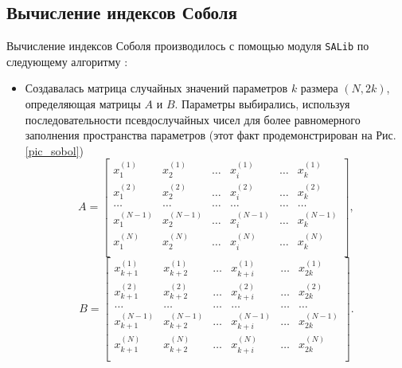 \documentclass[a4paper,12pt]{article} %
\begin{document}
\subsection{Вычисление индексов Соболя}
Вычисление индексов Соболя производилось с помощью модуля \texttt{SALib} \cite{Iwanaga2022, Herman2017} по следующему алгоритму \cite{saltelli2008global}:
\begin{itemize}
\item Создавалась матрица случайных значений параметров $k$ размера $(N,2k)$, определяющая матрицы $A$ и $B$. Параметры выбирались, используя последовательности псевдослучайных чисел для более равномерного заполнения пространства параметров \cite{sobol1967distribution, sobol1976uniformly} (этот факт продемонстрирован на Рис. \ref{pic_sobol})
\begin{displaymath}
A=\begin{bmatrix}
x_1^{(1)} & x_2^{(1)} & \ldots & x_i^{(1)} & \ldots & x_k^{(1)} \\
x_1^{(2)} & x_2^{(2)} & \ldots & x_i^{(2)} & \ldots & x_k^{(2)} \\
\ldots & \ldots & \ldots & \ldots & \ldots & \ldots \\
x_1^{(N-1)} & x_2^{(N-1)} & \ldots & x_i^{(N-1)} & \ldots & x_k^{(N-1)} \\
x_1^{(N)} & x_2^{(N)} & \ldots & x_i^{(N)} & \ldots & x_k^{(N)} \\
\end{bmatrix},
\end{displaymath}
\begin{displaymath}
B=\begin{bmatrix}
x_{k+1}^{(1)} & x_{k+2}^{(1)} & \ldots & x_{k+i}^{(1)} & \ldots & x_{2k}^{(1)} \\
x_{k+1}^{(2)} & x_{k+2}^{(2)} & \ldots & x_{k+i}^{(2)} & \ldots & x_{2k}^{(2)} \\
\ldots & \ldots & \ldots & \ldots & \ldots & \ldots \\
x_{k+1}^{(N-1)} & x_{k+2}^{(N-1)} & \ldots & x_{k+i}^{(N-1)} & \ldots & x_{2k}^{(N-1)} \\
x_{k+1}^{(N)} & x_{k+2}^{(N)} & \ldots & x_{k+i}^{(N)} & \ldots & x_{2k}^{(N)} \\
\end{bmatrix}.
\end{displaymath}


\end{itemize}
\end{document}
